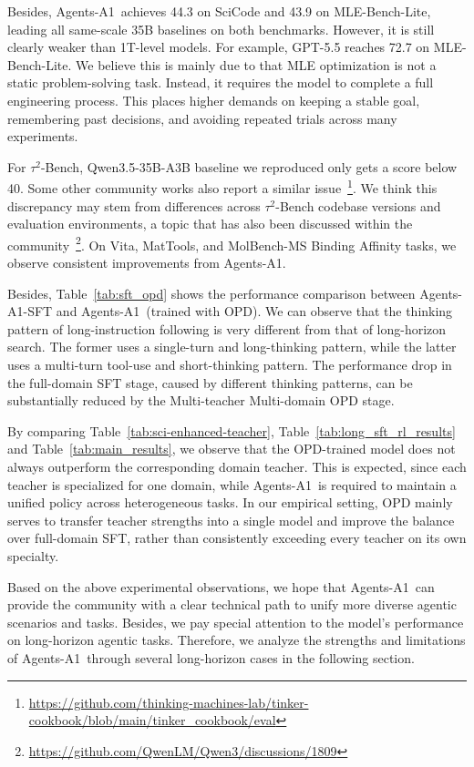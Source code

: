 \documentclass{llmxive}
\providecommand{\ProjectName}{Agents-A1}
\begin{document}
Besides, \ProjectName~achieves 44.3 on SciCode and 43.9 on MLE-Bench-Lite, leading all same-scale 35B baselines on both benchmarks. However, it is still clearly weaker than 1T-level models. For example, GPT-5.5 reaches 72.7 on MLE-Bench-Lite. We believe this is mainly due to that MLE optimization is not a static problem-solving task. Instead, it requires the model to complete a full engineering process. This places higher demands on keeping a stable goal, remembering past decisions, and avoiding repeated trials across many experiments.

For $\tau^2$-Bench, Qwen3.5-35B-A3B baseline we reproduced only gets a score below 40. Some other community works also report a similar issue~\footnote{\url{https://github.com/thinking-machines-lab/tinker-cookbook/blob/main/tinker_cookbook/eval}}. We think this discrepancy may stem from differences across $\tau^2$-Bench codebase versions and evaluation environments, a topic that has also been discussed within the community~\footnote{\url{https://github.com/QwenLM/Qwen3/discussions/1809}}.
On Vita, MatTools, and MolBench-MS Binding Affinity tasks, we observe consistent improvements from \ProjectName.

Besides, Table~\ref{tab:sft_opd} shows the performance comparison between \ProjectName-SFT and \ProjectName~(trained with OPD). We can observe that the thinking pattern of long-instruction following is very different from that of long-horizon search. The former uses a single-turn and long-thinking pattern, while the latter uses a multi-turn tool-use and short-thinking pattern. The performance drop in the full-domain SFT stage, caused by different thinking patterns, can be substantially reduced by the Multi-teacher Multi-domain OPD stage. 

By comparing Table~\ref{tab:sci-enhanced-teacher}, Table~\ref{tab:long_sft_rl_results} and Table~\ref{tab:main_results}, we observe that the OPD-trained model does not always outperform the corresponding domain teacher. This is expected, since each teacher is specialized for one domain, while \ProjectName~is required to maintain a unified policy across heterogeneous tasks. In our empirical setting, OPD mainly serves to transfer teacher strengths into a single model and improve the balance over full-domain SFT, rather than consistently exceeding every teacher on its own specialty.

Based on the above experimental observations, we hope that \ProjectName~can provide the community with a clear technical path to unify more diverse agentic scenarios and tasks. Besides, we pay special attention to the model’s performance on long-horizon agentic tasks. Therefore, we analyze the strengths and limitations of \ProjectName~through several long-horizon cases in the following section.
\end{document}
